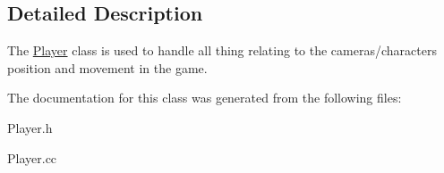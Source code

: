 \subsection{Detailed Description}
The \hyperlink{classPlayer}{Player} class is used to handle all thing relating to the cameras/characters position and movement in the game. 

The documentation for this class was generated from the following files\+:\begin{DoxyCompactItemize}
\item 
Player.\+h\item 
Player.\+cc\end{DoxyCompactItemize}
